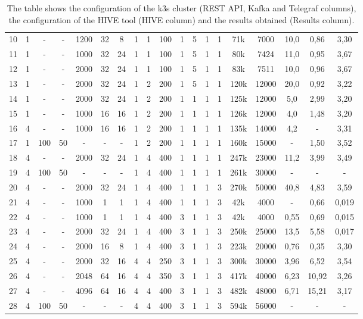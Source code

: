 \documentclass[]{IEEEtran}
\begin{document}
\begin{table*}[!ht]
{\begin{tabular}{c||ccc|ccc||ccc||c||ccc||ccccc||}
10 & 1 & -   & -  & 1200 & 32 & 8   & 1 & 1 & 100 & 1 & 5  & 1 & 1 & 71k  & 7000  & 10,0 & 0,86& 3,30\\
11 & 1 & -   & -  & 1000 & 32 & 24  & 1 & 1 & 100 & 1 & 5  & 1 & 1 & 80k  & 7424  & 11,0 & 0,95& 3,67\\
12 & 1 & -   & -  & 2000 & 32 & 24  & 1 & 1 & 100 & 1 & 5  & 1 & 1 & 83k  & 7511  & 10,0 & 0,96& 3,67\\
13 & 1 & -   & -  & 2000 & 32 & 24  & 1 & 2 & 200 & 1 & 5  & 1 & 1 & 120k & 12000 & 20,0 & 0,92& 3,22\\
14 & 1 & -   & -  & 2000 & 32 & 24  & 1 & 2 & 200 & 1 & 1  & 1 & 1 & 125k & 12000 & 5,0  & 2,99& 3,20\\
15 & 1 & -   & -  & 1000 & 16 & 16  & 1 & 2 & 200 & 1 & 1  & 1 & 1 & 126k & 12000 & 4,0  & 1,48& 3,20\\
16 & 4 & -   & -  & 1000 & 16 & 16  & 1 & 2 & 200 & 1 & 1  & 1 & 1 & 135k & 14000 & 4,2  & -& 3,31\\
17 & 1 & 100 & 50 & -    & -  & -   & 1 & 2 & 200 & 1 & 1  & 1 & 1 & 160k & 15000 & -    & 1,50 & 3,52\\
18 & 4 & -   & -  & 2000 & 32 & 24  & 1 & 4 & 400 & 1 & 1  & 1 & 1 & 247k & 23000 & 11,2 & 3,99& 3,49\\
19 & 4 & 100 & 50 & -    & -  & -   & 1 & 4 & 400 & 1 & 1  & 1 & 1 & 261k & 30000 & -    & -& -\\
20 & 4 & -   & -  & 2000 & 32 & 24  & 1 & 4 & 400 & 1 & 1  & 1 & 3 & 270k & 50000 & 40,8 & 4,83 & 3,59\\
21 & 4 & -   & -  & 1000 & 1  & 1   & 1 & 4 & 400 & 1 & 1  & 1 & 3 & 42k  & 4000  & -    & 0,66 & 0,019\\
22 & 4 & -   & -  & 1000 & 1  & 1   & 1 & 4 & 400 & 3 & 1  & 1 & 3 & 42k  & 4000  & 0,55 & 0,69& 0,015\\
23 & 4 & -   & -  & 2000 & 32 & 24  & 1 & 4 & 400 & 3 & 1  & 1 & 3 & 250k & 25000 & 13,5 & 5,58& 0,017\\
24 & 4 & -   & -  & 2000 & 16 & 8   & 1 & 4 & 400 & 3 & 1  & 1 & 3 & 223k & 20000 & 0,76 & 0,35& 3,30\\
25 & 4 & -   & -  & 2000 & 32 & 16  & 4 & 4 & 250 & 3 & 1  & 1 & 3 & 300k & 30000 & 3,96 & 6,52& 3,54\\
26 & 4 & -   & -  & 2048 & 64 & 16  & 4 & 4 & 350 & 3 & 1  & 1 & 3 & 417k & 40000 & 6,23 & 10,92& 3,26\\
27 & 4 & -   & -  & 4096 & 64 & 16  & 4 & 4 & 400 & 3 & 1  & 1 & 3 & 482k & 48000 & 6,71 & 15,21& 3,17\\
28 & 4 & 100 & 50 & -    & -  & -   & 4 & 4 & 400 & 3 & 1  & 1 & 3 & 594k & 56000 & -    & -    & -\\

\end{tabular}}
\caption{The table shows the configuration of the k3s cluster (REST API, Kafka and Telegraf columns), the configuration of the HIVE tool (HIVE column) and the results obtained (Results column).}\label{tab:results}
\vspace{-0.5cm}
\end{table*}
\end{document}
